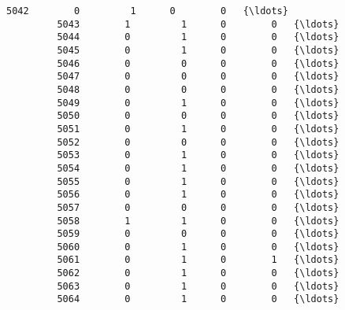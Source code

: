\documentclass[11pt]{article}
\begin{document}
\begin{Verbatim}[commandchars=\\\{\}]
         5042        0         1      0        0   {\ldots}      
         5043        1         1      0        0   {\ldots}      
         5044        0         1      0        0   {\ldots}      
         5045        0         1      0        0   {\ldots}      
         5046        0         0      0        0   {\ldots}      
         5047        0         0      0        0   {\ldots}      
         5048        0         0      0        0   {\ldots}      
         5049        0         1      0        0   {\ldots}      
         5050        0         0      0        0   {\ldots}      
         5051        0         1      0        0   {\ldots}      
         5052        0         0      0        0   {\ldots}      
         5053        0         1      0        0   {\ldots}      
         5054        0         1      0        0   {\ldots}      
         5055        0         1      0        0   {\ldots}      
         5056        0         1      0        0   {\ldots}      
         5057        0         0      0        0   {\ldots}      
         5058        1         1      0        0   {\ldots}      
         5059        0         0      0        0   {\ldots}      
         5060        0         1      0        0   {\ldots}      
         5061        0         1      0        1   {\ldots}      
         5062        0         1      0        0   {\ldots}      
         5063        0         1      0        0   {\ldots}      
         5064        0         1      0        0   {\ldots}      
         

\end{Verbatim}
\end{document}
